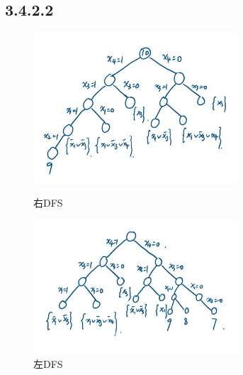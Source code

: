 \documentclass{article}
\begin{document}
	\subsection*{3.4.2.2}
	\begin{figure}[H]
		\begin{minipage}[t]{0.5\linewidth}
			\centering
			\includegraphics[width=3in]{ex4-2.jpg}
			\caption{右DFS}
		\end{minipage}%
		\begin{minipage}[t]{0.5\linewidth}
			\centering
			\includegraphics[width=3in]{ex4-3.jpg}
			\caption{左DFS}
		\end{minipage}
	\end{figure}
\end{document}
